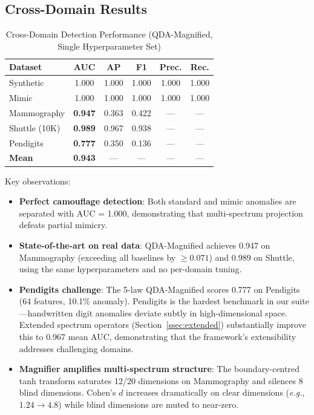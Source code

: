 \documentclass[journal]{IEEEtran}
\newcommand{\eg}{\textit{e.g.}}
\begin{document}
\subsection{Cross-Domain Results}
\label{ssec:results}

\begin{table}[h]
\centering
\caption{Cross-Domain Detection Performance (QDA-Magnified, Single Hyperparameter Set)}
\label{tab:results}
\begin{tabular}{@{}lccccc@{}}
\toprule
\textbf{Dataset} & \textbf{AUC} & \textbf{AP} & \textbf{F1} & \textbf{Prec.} & \textbf{Rec.} \\
\midrule
Synthetic & 1.000 & 1.000 & 1.000 & 1.000 & 1.000 \\
Mimic & 1.000 & 1.000 & 1.000 & 1.000 & 1.000 \\
Mammography & \textbf{0.947} & 0.363 & 0.422 & --- & --- \\
Shuttle (10K) & \textbf{0.989} & 0.967 & 0.938 & --- & --- \\
Pendigits & \textbf{0.777} & 0.350 & 0.136 & --- & --- \\
\midrule
\textbf{Mean} & \textbf{0.943} & --- & --- & --- & --- \\
\bottomrule
\end{tabular}
\end{table}

Key observations:

\begin{itemize}
  \item \textbf{Perfect camouflage detection}: Both standard and mimic anomalies are separated with AUC = 1.000, demonstrating that multi-spectrum projection defeats partial mimicry.
  \item \textbf{State-of-the-art on real data}: QDA-Magnified achieves 0.947 on Mammography (exceeding all baselines by $\geq 0.071$) and 0.989 on Shuttle, using the same hyperparameters and no per-domain tuning.
  \item \textbf{Pendigits challenge}: The 5-law QDA-Magnified scores 0.777 on Pendigits (64 features, 10.1\% anomaly). Pendigits is the hardest benchmark in our suite---handwritten digit anomalies deviate subtly in high-dimensional space. Extended spectrum operators (Section~\ref{ssec:extended}) substantially improve this to 0.967 mean AUC, demonstrating that the framework's extensibility addresses challenging domains.
  \item \textbf{Magnifier amplifies multi-spectrum structure}: The boundary-centred tanh transform saturates 12/20 dimensions on Mammography and silences 8 blind dimensions. Cohen's $d$ increases dramatically on clear dimensions (\eg, $1.24 \to 4.8$) while blind dimensions are muted to near-zero.
\end{itemize}
\end{document}
